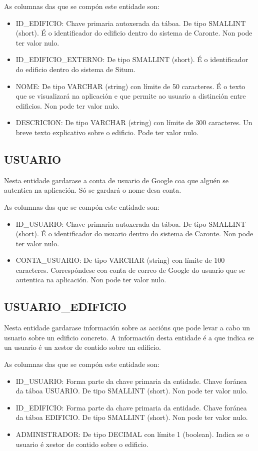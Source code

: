 As columnas das que se compón este entidade son:
\begin{itemize}
	\item ID\_EDIFICIO: Chave primaria autoxerada da táboa. De tipo SMALLINT (short). É o identificador do edificio dentro do sistema de Caronte. Non pode ter valor nulo.
	\item ID\_EDIFICIO\_EXTERNO: De tipo SMALLINT (short). É o identificador do edificio dentro do sistema de Situm.
	\item NOME: De tipo VARCHAR (string) con límite de 50 caracteres. É o texto que se visualizará na aplicación e que permite ao usuario a distinción entre edificios. Non pode ter valor nulo.
	\item DESCRICION: De tipo VARCHAR (string) con límite de 300 caracteres. Un breve texto explicativo sobre o edificio. Pode ter valor nulo.
\end{itemize}

\subsection{USUARIO}
Nesta entidade gardarase a conta de usuario de Google coa que alguén se autentica na aplicación. Só se gardará o nome desa conta.

As columnas das que se compón este entidade son:
\begin{itemize}
	\item ID\_USUARIO: Chave primaria autoxerada da táboa. De tipo SMALLINT (short). É o identificador do usuario dentro do sistema de Caronte. Non pode ter valor nulo.
	\item CONTA\_USUARIO: De tipo VARCHAR (string) con límite de 100 caracteres. Correspóndese coa conta de correo de Google do usuario que se autentica na aplicación. Non pode ter valor nulo.
\end{itemize}

\subsection{USUARIO\_EDIFICIO}
Nesta entidade gardarase información sobre as accións que pode levar a cabo un usuario sobre un edificio concreto. A información desta entidade é a que indica se un usuario é un xestor de contido sobre un edificio.

As columnas das que se compón este entidade son:
\begin{itemize}
	\item ID\_USUARIO: Forma parte da chave primaria da entidade. Chave foránea da táboa USUARIO. De tipo SMALLINT (short). Non pode ter valor nulo.
	\item ID\_EDIFICIO: Forma parte da chave primaria da entidade. Chave foránea da táboa EDIFICIO. De tipo SMALLINT (short). Non pode ter valor nulo.
	\item ADMINISTRADOR: De tipo DECIMAL con límite 1 (boolean). Indica se o usuario é xestor de contido sobre o edificio.
\end{itemize}


